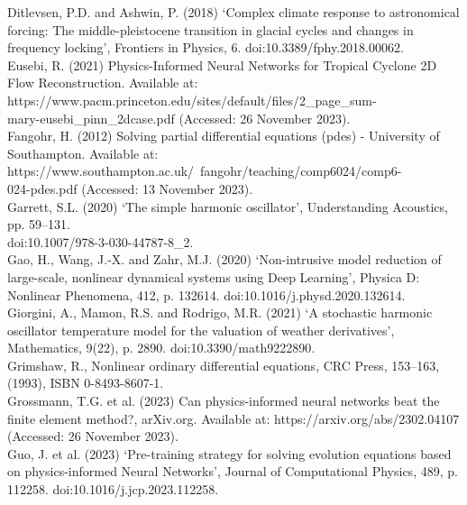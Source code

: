 \documentclass[12pt, openany]{book}
\begin{document}
Ditlevsen, P.D. and Ashwin, P. (2018) ‘Complex climate response to astronomical forcing: The middle-pleistocene transition in glacial cycles and changes in frequency locking’, Frontiers in Physics, 6. doi:10.3389/fphy.2018.00062. \\

Eusebi, R. (2021) Physics-Informed Neural Networks for Tropical Cyclone 2D Flow Reconstruction. Available at: https://www.pacm.princeton.edu/sites/default/files/2{\_}page{\_}sum- \\ mary-eusebi{\_}pinn{\_}2dcase.pdf (Accessed: 26 November 2023). \\

Fangohr, H. (2012) Solving partial differential equations (pdes) - University of Southampton. Available at: https://www.southampton.ac.uk/~fangohr/teaching/comp6024/comp6- \\ 024-pdes.pdf (Accessed: 13 November 2023). \\

Garrett, S.L. (2020) ‘The simple harmonic oscillator’, Understanding Acoustics, pp. 59–131. \\ doi:10.1007/978-3-030-44787-8{\_}2. \\

Gao, H., Wang, J.-X. and Zahr, M.J. (2020) ‘Non-intrusive model reduction of large-scale, nonlinear dynamical systems using Deep Learning’, Physica D: Nonlinear Phenomena, 412, p. 132614. doi:10.1016/j.physd.2020.132614. \\

Giorgini, A., Mamon, R.S. and Rodrigo, M.R. (2021) ‘A stochastic harmonic oscillator temperature model for the valuation of weather derivatives’, Mathematics, 9(22), p. 2890. doi:10.3390/math9222890. \\

Grimshaw, R., Nonlinear ordinary differential equations, CRC Press, 153–163, (1993), ISBN 0-8493-8607-1. \\

Grossmann, T.G. et al. (2023) Can physics-informed neural networks beat the finite element method?, arXiv.org. Available at: https://arxiv.org/abs/2302.04107 (Accessed: 26 November 2023). \\

Guo, J. et al. (2023) ‘Pre-training strategy for solving evolution equations based on physics-informed Neural Networks’, Journal of Computational Physics, 489, p. 112258. doi:10.1016/j.jcp.2023.112258. \\
\end{document}
